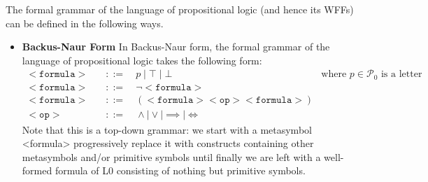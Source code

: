 \newpage
\begin{tcolorbox}[colframe=defcolor,title={\color{white}\bf Formal Grammer}]
\begin{definition}
The formal grammar of the language of propositional logic (and hence its WFFs) can be defined in the following ways.
\begin{itemize}
	\item \textbf{Backus-Naur Form}
	In Backus-Naur form, the formal grammar of the language of propositional logic takes the following form:
	\begin{align*}
		<\texttt{formula}>\quad &::=\quad p\mid\top\mid\bot &\text{where $p\in\mathcal{P}_0$ is a letter}\\
		<\texttt{formula}>\quad &::=\quad \lnot<\texttt{formula}>\\
		<\texttt{formula}>\quad &::=\quad (<\texttt{formula}> <\texttt{op}> <\texttt{formula}>)\\
		<\texttt{op}>\quad &::=\quad \land\mid\lor\mid\implies\mid\iff
	\end{align*} Note that this is a top-down grammar:
we start with a metasymbol <formula>
progressively replace it with constructs containing other metasymbols and/or primitive symbols
until finally we are left with a well-formed formula of L0
consisting of nothing but primitive symbols.
\end{itemize}

\end{definition}
\end{tcolorbox}